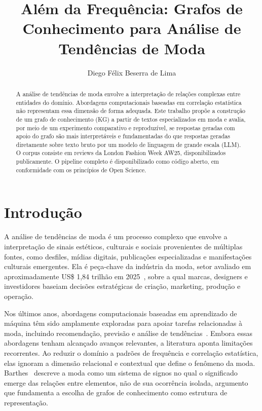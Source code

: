 \documentclass[sigconf]{acmart}
\begin{document}
\title{Além da Frequência: Grafos de Conhecimento para Análise de Tendências de Moda}

\author{Diego Félix Beserra de Lima}

\begin{abstract}
A análise de tendências de moda envolve a interpretação de relações complexas entre entidades do domínio. Abordagens computacionais baseadas em correlação estatística não representam essa dimensão de forma adequada. Este trabalho propõe a construção de um grafo de conhecimento (KG) a partir de textos especializados em moda e avalia, por meio de um experimento comparativo e reproduzível, se respostas geradas com apoio do grafo são mais interpretáveis e fundamentadas do que respostas geradas diretamente sobre texto bruto por um modelo de linguagem de grande escala (LLM). O corpus consiste em reviews da London Fashion Week AW25, disponibilizados publicamente. O pipeline completo é disponibilizado como código aberto, em conformidade com os princípios de Open Science.
\end{abstract}


\maketitle
\sloppy

\section{Introdução}

A análise de tendências de moda é um processo complexo que envolve a interpretação de sinais estéticos, culturais e sociais provenientes de múltiplas fontes, como desfiles, mídias digitais, publicações especializadas e manifestações culturais emergentes. Ela é peça-chave da indústria da moda, setor avaliado em aproximadamente US\$ 1,84 trilhão em 2025~\cite{statista2025}, sobre a qual marcas, designers e investidores baseiam decisões estratégicas de criação, marketing, produção e operação.

Nos últimos anos, abordagens computacionais baseadas em aprendizado de máquina têm sido amplamente exploradas para apoiar tarefas relacionadas à moda, incluindo recomendação, previsão e análise de tendências~\cite{jiju2024}. Embora essas abordagens tenham alcançado avanços relevantes, a literatura aponta limitações recorrentes. Ao reduzir o domínio a padrões de frequência e correlação estatística, elas ignoram a dimensão relacional e contextual que define o fenômeno da moda. Barthes~\cite{barthes1967} descreve a moda como um sistema de signos no qual o significado emerge das relações entre elementos, não de sua ocorrência isolada, argumento que fundamenta a escolha de grafos de conhecimento como estrutura de representação.
\end{document}
